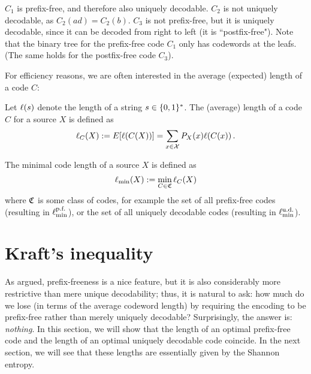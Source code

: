 \begin{example}
\begin{center}
%
\qquad
%
\end{center}
$C_1$ is prefix-free, and therefore also uniquely decodable. $C_2$ is not uniquely decodable, as $C_2(ad) = C_2(b)$.  $C_3$ is not prefix-free, but it is uniquely decodable, since it can be decoded from right to left (it is ``postfix-free"). Note that the binary tree for the prefix-free code $C_1$ only has codewords at the leafs. (The same holds for the postfix-free code $C_3$).
\end{example}
For efficiency reasons, we are often interested in the average (expected) length of a code $C$:
\begin{definition}
Let $\ell(s)$ denote the length of a string $s \in \{0,1\}^*$. The (average) length of a code $C$ for a source $X$ is defined as
\[
\ell_C(X) := E[\ell(C(X))] = \sum_{x \in \cal X} P_X(x) \ell(C(x)) \, .
\]
\end{definition}
\begin{definition}
The minimal code length of a source $X$ is defined as
\[
\ell_{\min}(X) := \min_{C \in \frak{C}} \ell_C(X)
\]
where $\frak{C}$ is some class of codes, for example the set of all prefix-free codes (resulting in $\ell_{\min}^{\text{\rm p.f.}}$), or the set of all uniquely decodable codes (resulting in $\ell_{\min}^{\text{\rm u.d.}}$). 
\end{definition}



\section{Kraft's inequality}\label{sec:kraft}
As argued, prefix-freeness is a nice feature, but it is also considerably more restrictive than mere unique decodability; thus, it is natural to ask: how much do we lose (in terms of the average codeword length) by requiring the encoding to be prefix-free rather than merely uniquely decodable? Surprisingly, the answer is: {\em nothing}. In this section, we will show that the length of an optimal prefix-free code and the length of an optimal uniquely decodable code coincide. In the next section, we will see that these lengths are essentially given by the Shannon entropy.

